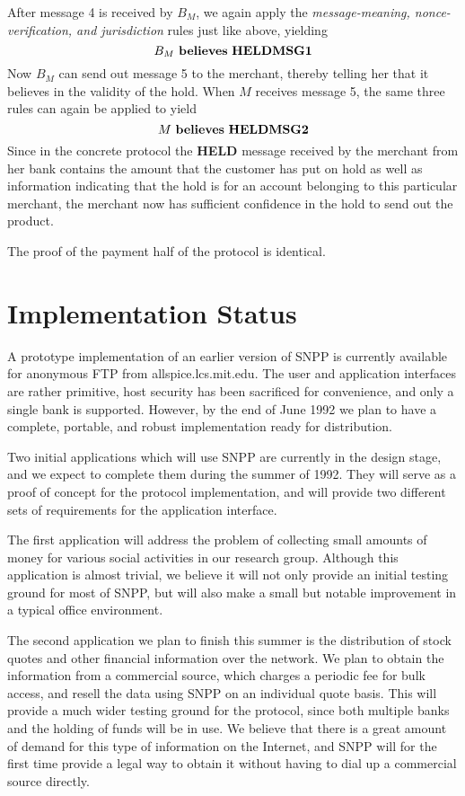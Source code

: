 After message 4 is received
by $B_{M}$, we again apply the {\em message-meaning, nonce-verification,
and jurisdiction} rules just like above, yielding
\[B_{M}\ {\bf believes}\ {\bf HELDMSG1}\]
Now $B_{M}$ can send out message 5 to the merchant, thereby telling her
that it believes in the validity of the hold.  When $M$ receives message 5,
the same three rules can again be applied to yield
\[M\ {\bf believes}\ {\bf HELDMSG2}\]
Since in the concrete protocol the {\bf HELD} message received by the
merchant from her bank contains the amount that the customer has put on
hold as well as information indicating that the hold is for an account belonging to
this particular merchant, the merchant now has sufficient confidence in
the hold to send out the product.

The proof of the payment half of the protocol is identical.

\section{Implementation Status}
A prototype implementation of an earlier version of SNPP is currently
available for anonymous FTP from allspice.lcs.mit.edu.  The user and
application interfaces are rather primitive, host security has been
sacrificed for convenience, and only a single bank is supported.
However, by the end of June 1992 we plan to have a complete, portable,
and robust implementation ready for distribution.

Two initial applications which will use SNPP are currently in the
design stage,
and we expect to complete them during the summer of 1992.  They will
serve as a proof of concept for the protocol implementation, and will
provide two different sets of requirements for the application interface.

The first application will address the problem of collecting small
amounts of money for various social activities in our research group.
Although this application is
almost trivial, we believe it will not only provide an initial testing
ground for most of SNPP, but will also make a small but notable
improvement in a typical office environment.

The second application we plan to finish this summer is the
distribution of stock quotes and other financial information over the
network.  We plan to obtain the information from a commercial source,
which charges a periodic fee for bulk access, and resell the data
using SNPP on an individual quote basis.  This will provide a much
wider testing ground for the protocol, since both multiple banks and
the holding of funds will be in use.  We believe that there is a great
amount of demand for this type of information on the Internet, and
SNPP will for the first time provide a legal way to obtain it
without having to dial up a commercial source directly.

